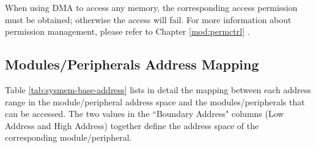 \documentclass[main\_\_EN.tex]{subfiles}
\begin{document}
\begin{tiplisting}
When using DMA to access any memory, the corresponding access permission must be obtained; otherwise the access will fail. For more information about permission management, please refer to Chapter \ref{mod:permctrl} \textit{}.
\end{tiplisting}






\subsection{Modules/Peripherals Address Mapping}
\label{para:sysmem-mod-peri-add-mapping}

Table \ref{tab:sysmem-base-address} lists in detail the mapping between each address range in the module/peripheral address space and the modules/peripherals that can be accessed.
The two values in the ``Boundary Address" columns (Low Address and High Address) together define the address space of the corresponding module/peripheral.

\end{document}

